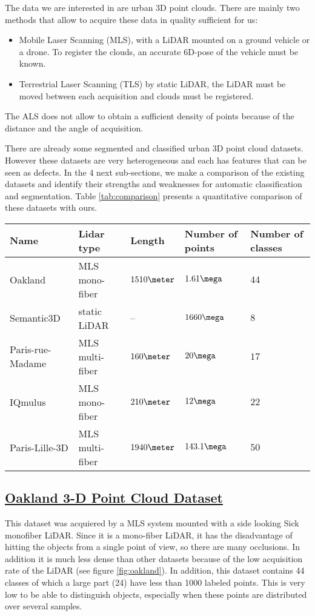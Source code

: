 \documentclass[a4paper, 10pt, journal]{article}
\begin{document}
The data we are interested in are urban 3D point clouds. There are mainly two methods that allow to acquire these data in quality sufficient for us:
\begin{itemize}
 \item Mobile Laser Scanning (MLS), with a LiDAR mounted on a ground vehicle or a drone. To register the clouds, an accurate 6D-pose of the vehicle must be known.
 \item  Terrestrial Laser Scanning (TLS) by static LiDAR, the LiDAR must be moved between each acquisition and clouds must be registered.
\end{itemize}
The ALS does not allow to obtain a sufficient density of points because of the distance and the angle of acquisition.

There are already some segmented and classified urban 3D point cloud datasets. However these datasets are very heterogeneous and each has features that can be seen as defects. In the 4 next sub-sections, we make a comparison of the existing datasets and identify their strengths and weaknesses for automatic classification and segmentation. Table \ref{tab:comparison} presents a quantitative comparison of these datasets with ours.

\begin{table*}\centering
 \begin{tabular}{C{2.3cm}C{2.5cm}C{2.0cm}C{2.2cm}C{2.2cm}}
  \toprule
   \textbf{Name} & \textbf{Lidar type} & \textbf{Length} & \textbf{Number of points} & \textbf{Number of classes} \\\midrule
   Oakland & MLS mono-fiber & $1510\meter$ & $1.61\mega$ & $44$ \\\midrule
   Semantic3D & static LiDAR & -- & $1660\mega$ & $8$ \\\midrule
   Paris-rue-Madame & MLS multi-fiber & $160\meter$ & $20\mega$ & $17$ \\\midrule
   IQmulus & MLS mono-fiber & $210\meter$ & $12\mega$ & $22$ \\\midrule
   Paris-Lille-3D & MLS multi-fiber & $1940\meter$ & $143.1\mega$ & $50$ \\
  \bottomrule 
 \end{tabular}
\end{table*}

\subsection{\href{http://www.cs.cmu.edu/~vmr/datasets/oakland_3d/cvpr09/doc/}{Oakland 3-D Point Cloud Dataset} \cite{munoz2009contextual}}\label{subsec:oakland}
This dataset was acquiered by a MLS system mounted with a side looking Sick monofiber LiDAR. Since it is a mono-fiber LiDAR, it has the disadvantage of hitting the objects from a single point of view, so there are many occlusions. In addition it is much less dense than other datasets because of the low acquisition rate of the LiDAR (see figure \ref{fig:oakland}).
In addition, this dataset contains 44 classes of which a large part (24) have less than 1000 labeled points. This is very low to be able to distinguish objects, especially when these points are distributed over several samples.
\end{document}
